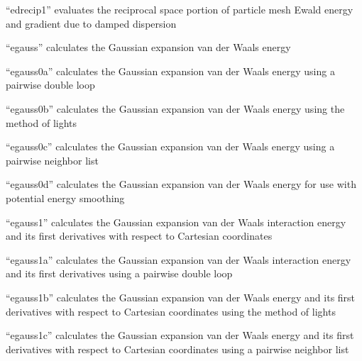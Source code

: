 \documentclass[letterpaper,11pt,english]{sphinxmanual}
\begin{document}
\sphinxAtStartPar
{}

\sphinxAtStartPar
“edrecip1” evaluates the reciprocal space portion of particle mesh Ewald energy and gradient due to damped dispersion

\sphinxAtStartPar
{}

\sphinxAtStartPar
“egauss” calculates the Gaussian expansion van der Waals energy

\sphinxAtStartPar
{}

\sphinxAtStartPar
“egauss0a” calculates the Gaussian expansion van der Waals energy using a pairwise double loop

\sphinxAtStartPar
{}

\sphinxAtStartPar
“egauss0b” calculates the Gaussian expansion van der Waals energy using the method of lights

\sphinxAtStartPar
{}

\sphinxAtStartPar
“egauss0c” calculates the Gaussian expansion van der Waals energy using a pairwise neighbor list

\sphinxAtStartPar
{}

\sphinxAtStartPar
“egauss0d” calculates the Gaussian expansion van der Waals energy for use with potential energy smoothing

\sphinxAtStartPar
{}

\sphinxAtStartPar
“egauss1” calculates the Gaussian expansion van der Waals interaction energy and its first derivatives with respect to Cartesian coordinates

\sphinxAtStartPar
{}

\sphinxAtStartPar
“egauss1a” calculates the Gaussian expansion van der Waals interaction energy and its first derivatives using a pairwise double loop

\sphinxAtStartPar
{}

\sphinxAtStartPar
“egauss1b” calculates the Gaussian expansion van der Waals energy and its first derivatives with respect to Cartesian coordinates using the method of lights

\sphinxAtStartPar
{}

\sphinxAtStartPar
“egauss1c” calculates the Gaussian expansion van der Waals energy and its first derivatives with respect to Cartesian coordinates using a pairwise neighbor list
\end{document}
